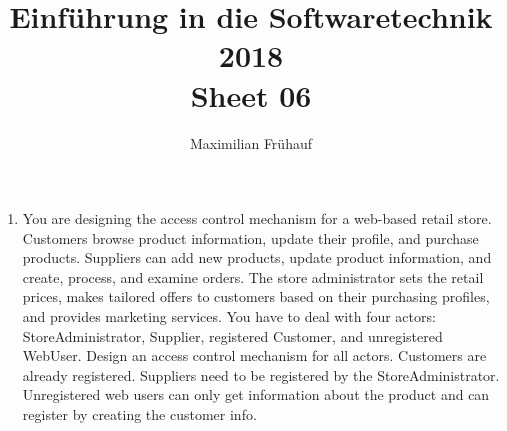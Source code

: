 \documentclass[a4paper, 10pt]{article}
\title{Einführung in die Softwaretechnik 2018 \\ Sheet 06}
\author{Maximilian Frühauf}
\begin{document}
\maketitle
\begin{enumerate}
    \item You are designing the access control mechanism for a web-based retail store. 
    Customers browse product information, update their profile, and purchase products. 
    Suppliers can add new products, update product information, and create, process, and examine orders. 
    The store administrator sets the retail prices, makes tailored offers to customers based on their purchasing profiles, 
    and provides marketing services. You have to deal with four actors: StoreAdministrator, Supplier, 
    registered Customer, and unregistered WebUser. Design an access control mechanism for all actors. 
    Customers are already registered. Suppliers need to be registered by the StoreAdministrator. 
    Unregistered web users can only get information about the product and can register by creating the customer info.

    \vspace{0.5cm}


\end{enumerate}
\end{document}
